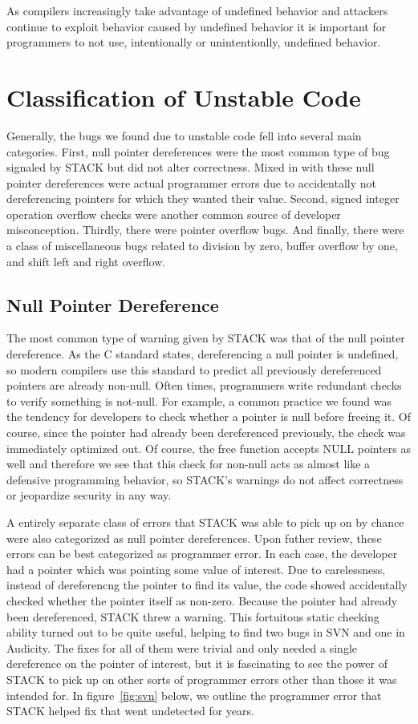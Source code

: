 \documentclass[9pt,twocolumn]{article}
\begin{document}
As compilers increasingly take advantage of undefined behavior \cite{stack} and
attackers continue to exploit behavior caused by undefined behavior it is
important for programmers to not use, intentionally or unintentionlly,
undefined behavior.

\section{Classification of Unstable Code}
\label{sec:classification}
Generally, the bugs we found due to unstable code fell into several
main categories. First, null pointer dereferences were the  most common type of 
bug signaled by STACK but did not alter correctness. Mixed in with these null pointer dereferences
were actual programmer errors due to accidentally not dereferencing pointers for which
they wanted their value. Second, signed integer operation overflow checks were another common source
of developer misconception. Thirdly, there were pointer overflow bugs. And finally, there were a class
of miscellaneous bugs related to division by zero, buffer overflow by one, and shift left and right overflow.


\subsection{Null Pointer Dereference}
The most common type of warning given by STACK was that of the null pointer dereference. As the C standard states, dereferencing a null pointer is undefined, so modern compilers use this standard to predict all previously dereferenced pointers are already non-null. Often times, programmers write redundant checks to verify something is not-null. For example, a common practice we found was the tendency for developers to check whether a pointer is null before freeing it. Of course, since the pointer had already been dereferenced previously, the check was immediately optimized out. Of course, the free function accepts NULL pointers as well and therefore we see that this check for non-null acts as almost like a defensive programming behavior, so STACK's warnings do not affect correctness or jeopardize security in any way. 

A entirely separate class of errors that STACK was able to pick up on by chance were also categorized as null pointer dereferences. Upon futher review, these errors can be best categorized as programmer error. In each case, the developer had a pointer which was pointing some value of interest. Due to carelessness, instead of dereferencng the pointer to find its value, the code showed accidentally checked whether the pointer itself as non-zero. Because the pointer had already been dereferenced, STACK threw a warning. This fortuitous static checking ability turned out to be quite useful, helping to find two bugs in SVN and one in Audicity. The fixes for all of them were trivial and only needed a single dereference on the pointer of interest, but it is fascinating to see the power of STACK to pick up on other sorts of programmer errors other than those it was intended for. In figure~\ref{fig:svn} below, we outline the programmer error that STACK helped fix that went undetected for years.
\end{document}
